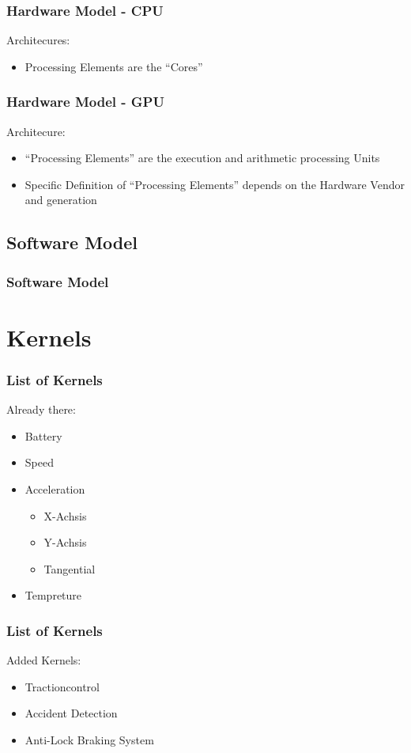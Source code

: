 \documentclass{beamer}
\begin{document}
\begin{frame}
    \frametitle{Hardware Model - CPU}
    Architecures:
    \begin{itemize}
        \item Processing Elements are the ``Cores''
        
    \end{itemize}
\end{frame}
\begin{frame}
    \frametitle{Hardware Model - GPU}
    Architecure:
    \begin{itemize}
     \item ``Processing Elements'' are the execution and arithmetic processing Units
     \item Specific Definition of ``Processing Elements'' depends on the Hardware Vendor and generation
    \end{itemize}
\end{frame}
\subsection{Software Model}
\begin{frame}
    \frametitle{Software Model}
\end{frame}

\section{Kernels}
\begin{frame} %
  \frametitle{List of Kernels} %
  Already there:
  \begin{itemize}
   \item Battery
   \item Speed
   \item Acceleration
   \begin{itemize}
    \item X-Achsis
    \item Y-Achsis
    \item Tangential
   \end{itemize}
   \item Tempreture
  \end{itemize}

\end{frame}
\begin{frame}
    \frametitle{List of Kernels}
    Added Kernels:
    \begin{itemize}
     \item Tractioncontrol
     \item Accident Detection
     \item Anti-Lock Braking System
    \end{itemize}
\end{frame}
\end{document}
